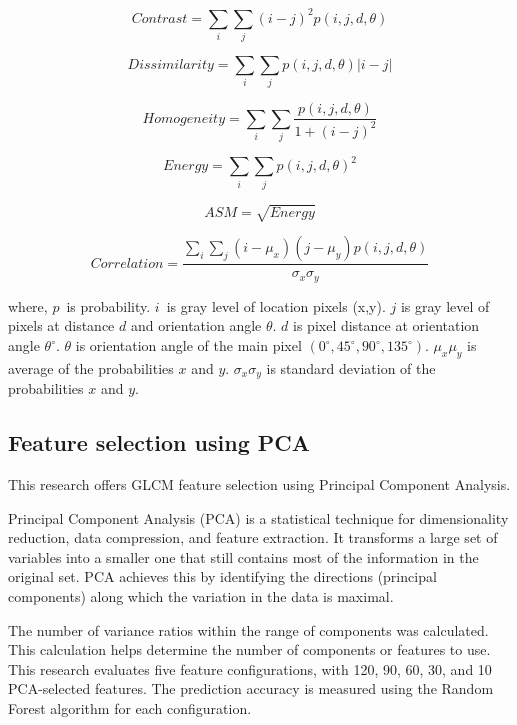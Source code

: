 \documentclass[10pt,a4paper]{article}
\begin{document}
\begin{equation} \label{eq:2}
Contrast=\sum_{i}\sum_{j}(i-j)^2 p(i,j,d,\theta)
\end{equation}

\begin{equation} \label{eq:3}
Dissimilarity=\sum_{i}\sum_{j}p(i,j,d,\theta)|i-j|
\end{equation}


\begin{equation} \label{eq:4}
Homogeneity=\sum_{i}\sum_{j}\frac{p(i,j,d,\theta)}{1+(i-j)^2}
\end{equation}


\begin{equation} \label{eq:5}
Energy=\sum_{i}\sum_{j}p(i,j,d,\theta)^2
\end{equation}

\begin{equation} \label{eq:6}
ASM=\sqrt{Energy}
\end{equation}


\begin{equation} \label{eq:7}
    Correlation=\frac{\sum_{i}\sum_{j}(i-\mu_x)(j-\mu_y)p(i,j,d,\theta)}{\sigma_x\sigma_y}
\end{equation} 

where, $p$\ is probability. $i$\ is gray level of location pixels (x,y). $j$ is gray level of pixels at distance $d$ and orientation angle $\theta$. $d$ is pixel distance at orientation angle $\theta^\circ$. $\theta$ is orientation angle of the main pixel $(0^\circ, 45^\circ, 90^\circ, 135^\circ)$. $\mu_x\mu_y$ is average of the probabilities $x$ and $y$. $\sigma_x\sigma_y$ is standard deviation of the probabilities $x$ and $y$.


\subsection{Feature selection using PCA}

This research offers GLCM feature selection using Principal Component Analysis.

Principal Component Analysis (PCA) is a statistical technique for dimensionality reduction, data compression, and feature extraction. It transforms a large set of variables into a smaller one that still contains most of the information in the original set. PCA achieves this by identifying the directions (principal components) along which the variation in the data is maximal.

The number of variance ratios within the range of components was calculated. This calculation helps determine the number of components or features to use. This research evaluates five feature configurations, with 120, 90, 60, 30, and 10 PCA-selected features. The prediction accuracy is measured using the Random Forest algorithm for each configuration.
\end{document}
